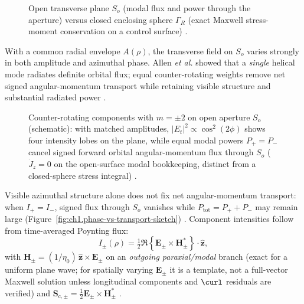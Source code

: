 \begin{figure}[t]
\centering
\VolIPhysFig{\VolIPhysOpenPlaneVsClosedSphere}
\caption{Open transverse plane $S_o$ (modal flux and power through the aperture) versus closed enclosing sphere $\Gamma_R$ (exact Maxwell stress-moment conservation on a control surface) \cite{stratton1941,beth1936}.}
\label{fig:ch1.open-plane-vs-closed}
\end{figure}

With a common radial envelope \(A(\rho)\), the transverse field on \(S_o\) varies strongly in both amplitude and azimuthal phase. Allen \emph{et al.} \cite{allen1992} showed that a \emph{single} helical mode radiates definite orbital flux; equal counter-rotating weights remove net signed angular-momentum transport while retaining visible structure and substantial radiated power \cite{poynting1884}.

\begin{figure}[t]
\centering
\VolIPhysFig{\VolIPhysCounterRotatingAperture}
\caption{Counter-rotating components with $m=\pm2$ on open aperture $S_o$ (schematic): with matched amplitudes, $|E_t|^2\propto\cos^2(2\phi)$ shows four intensity lobes on the plane, while equal modal powers $P_+=P_-$ cancel signed forward orbital angular-momentum flux through $S_o$ ($\dot J_z=0$ on the open-surface modal bookkeeping, distinct from a closed-sphere stress integral) \cite{allen1992,poynting1884}.}
\label{fig:ch1.ex62-counter-rotating-aperture}
\end{figure}

Visible azimuthal structure alone does not fix net angular-momentum transport: when \(I_+=I_-\), signed flux through $S_o$ vanishes while $P_{\mathrm{tot}}=P_++P_-$ may remain large (Figure~\ref{fig:ch1.phase-vs-transport-sketch}) \cite{beth1936,stratton1941}. Component intensities follow from time-averaged Poynting flux:
\begin{equation}
\label{eq:ch1.ex62-intensity-definition}
I_\pm(\rho)=\tfrac12\Re\!\left\{\mathbf{E}_\pm\times\mathbf{H}_\pm^*\right\}\cdot\hat{\mathbf{z}},
\end{equation}
with $\mathbf{H}_\pm=(1/\eta_0)\,\hat{\mathbf{z}}\times\mathbf{E}_\pm$ on an \emph{outgoing paraxial/modal} branch (exact for a uniform plane wave; for spatially varying $\mathbf{E}_\pm$ it is a template, not a full-vector Maxwell solution unless longitudinal components and $\curl$ residuals are verified) and $\mathbf{S}_{\mathrm{c},\pm}=\tfrac12\mathbf{E}_\pm\times\mathbf{H}_\pm^*$ \cite{stratton1941,allen1992}.

